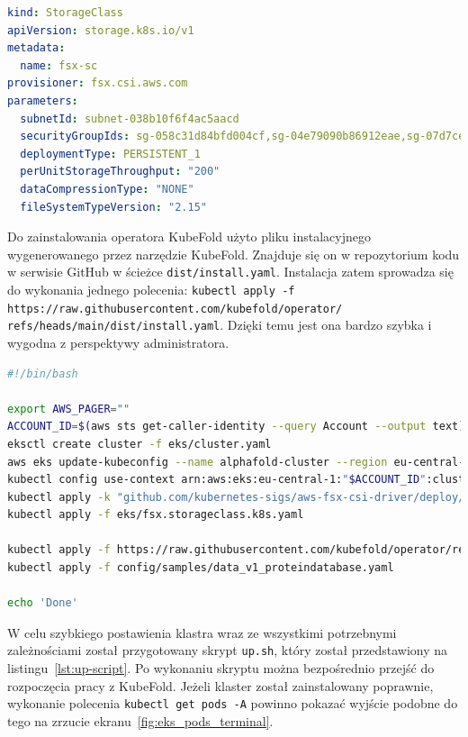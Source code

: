 \begin{lstlisting}[language=yaml,caption={Definition of \texttt{StorageClass} for FSx CSI Driver},label={lst:storage-class}]
kind: StorageClass
apiVersion: storage.k8s.io/v1
metadata:
  name: fsx-sc
provisioner: fsx.csi.aws.com
parameters:
  subnetId: subnet-038b10f6f4ac5aacd
  securityGroupIds: sg-058c31d84bfd004cf,sg-04e79090b86912eae,sg-07d7ceb3fa050568c,sg-02a2a067c7f724318
  deploymentType: PERSISTENT_1
  perUnitStorageThroughput: "200"
  dataCompressionType: "NONE"
  fileSystemTypeVersion: "2.15"
\end{lstlisting}

Do zainstalowania operatora KubeFold użyto pliku instalacyjnego wygenerowanego przez narzędzie KubeFold.
Znajduje się on w repozytorium kodu w serwisie GitHub w ścieżce \texttt{dist/install.yaml}.
Instalacja zatem sprowadza się do wykonania jednego polecenia: \texttt{kubectl apply -f https://raw.githubusercontent.com/kubefold/operator/ \n refs/heads/main/dist/install.yaml}.
Dzięki temu jest ona bardzo szybka i wygodna z perspektywy administratora.

\begin{lstlisting}[language=bash,caption={Quick project startup script},label={lst:up-script}]
#!/bin/bash

export AWS_PAGER=""
ACCOUNT_ID=$(aws sts get-caller-identity --query Account --output text)
eksctl create cluster -f eks/cluster.yaml
aws eks update-kubeconfig --name alphafold-cluster --region eu-central-1
kubectl config use-context arn:aws:eks:eu-central-1:"$ACCOUNT_ID":cluster/alphafold-cluster
kubectl apply -k "github.com/kubernetes-sigs/aws-fsx-csi-driver/deploy/kubernetes/overlays/stable/?ref=release-1.3"
kubectl apply -f eks/fsx.storageclass.k8s.yaml

kubectl apply -f https://raw.githubusercontent.com/kubefold/operator/refs/heads/main/dist/install.yaml
kubectl apply -f config/samples/data_v1_proteindatabase.yaml

echo 'Done'
\end{lstlisting}

W celu szybkiego postawienia klastra wraz ze wszystkimi potrzebnymi zależnościami został przygotowany skrypt \texttt{up.sh}, który został przedstawiony na listingu~\ref{lst:up-script}.
Po wykonaniu skryptu można bezpośrednio przejść do rozpoczęcia pracy z KubeFold.
Jeżeli klaster został zainstalowany poprawnie, wykonanie polecenia \texttt{kubectl get pods -A} powinno pokazać wyjście podobne do tego na zrzucie ekranu~\ref{fig:eks_pods_terminal}.

